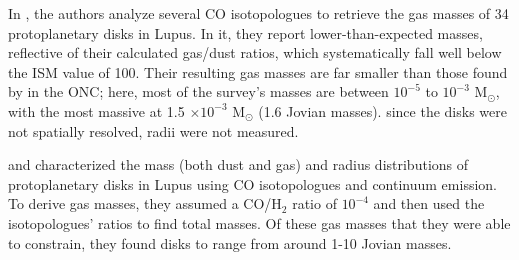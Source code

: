 In \citet{Miotello2016}, the authors analyze several CO isotopologues to retrieve the gas masses of 34 protoplanetary disks in Lupus. In it, they report lower-than-expected masses, reflective of their calculated gas/dust ratios, which systematically fall well below the ISM value of 100. Their resulting gas masses are far smaller than those found by \cite{Mann2014} in the ONC; here, most of the survey's masses are between $10^{-5}$ to $10^{-3}$ M$_\odot$, with the most massive at 1.5 $\times 10^{-3}$ M$_\odot$ (1.6 Jovian masses). since the disks were not spatially resolved, radii were not measured.


\citet{Ansdell2016} and \citet{Ansdell2018} characterized the mass (both dust and gas) and radius distributions of protoplanetary disks in Lupus using CO isotopologues and continuum emission. To derive gas masses, they assumed a CO/H$_2$ ratio of $10^{-4}$ and then used the isotopologues' ratios to find total masses. Of these gas masses that they were able to constrain, they found disks to range from around 1-10 Jovian masses.


